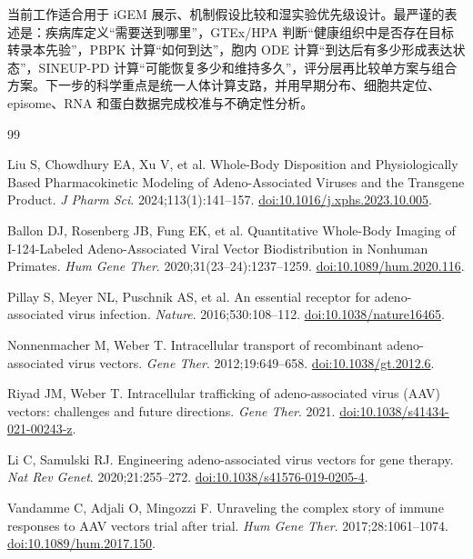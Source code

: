 \documentclass[UTF8,11pt,a4paper]{ctexart}
\begin{document}
当前工作适合用于 iGEM 展示、机制假设比较和湿实验优先级设计。最严谨的表述是：疾病库定义“需要送到哪里”，GTEx/HPA 判断“健康组织中是否存在目标转录本先验”，PBPK 计算“如何到达”，胞内 ODE 计算“到达后有多少形成表达状态”，SINEUP-PD 计算“可能恢复多少和维持多久”，评分层再比较单方案与组合方案。下一步的科学重点是统一人体计算支路，并用早期分布、细胞共定位、episome、RNA 和蛋白数据完成校准与不确定性分析。

\clearpage
\begin{thebibliography}{99}

Liu S, Chowdhury EA, Xu V, et al. Whole-Body Disposition and Physiologically Based Pharmacokinetic Modeling of Adeno-Associated Viruses and the Transgene Product. \textit{J Pharm Sci}. 2024;113(1):141--157. \href{https://doi.org/10.1016/j.xphs.2023.10.005}{doi:10.1016/j.xphs.2023.10.005}.

Ballon DJ, Rosenberg JB, Fung EK, et al. Quantitative Whole-Body Imaging of I-124-Labeled Adeno-Associated Viral Vector Biodistribution in Nonhuman Primates. \textit{Hum Gene Ther}. 2020;31(23--24):1237--1259. \href{https://doi.org/10.1089/hum.2020.116}{doi:10.1089/hum.2020.116}.

Pillay S, Meyer NL, Puschnik AS, et al. An essential receptor for adeno-associated virus infection. \textit{Nature}. 2016;530:108--112. \href{https://doi.org/10.1038/nature16465}{doi:10.1038/nature16465}.

Nonnenmacher M, Weber T. Intracellular transport of recombinant adeno-associated virus vectors. \textit{Gene Ther}. 2012;19:649--658. \href{https://doi.org/10.1038/gt.2012.6}{doi:10.1038/gt.2012.6}.

Riyad JM, Weber T. Intracellular trafficking of adeno-associated virus (AAV) vectors: challenges and future directions. \textit{Gene Ther}. 2021. \href{https://doi.org/10.1038/s41434-021-00243-z}{doi:10.1038/s41434-021-00243-z}.

Li C, Samulski RJ. Engineering adeno-associated virus vectors for gene therapy. \textit{Nat Rev Genet}. 2020;21:255--272. \href{https://doi.org/10.1038/s41576-019-0205-4}{doi:10.1038/s41576-019-0205-4}.

Vandamme C, Adjali O, Mingozzi F. Unraveling the complex story of immune responses to AAV vectors trial after trial. \textit{Hum Gene Ther}. 2017;28:1061--1074. \href{https://doi.org/10.1089/hum.2017.150}{doi:10.1089/hum.2017.150}.


\end{thebibliography}
\end{document}
